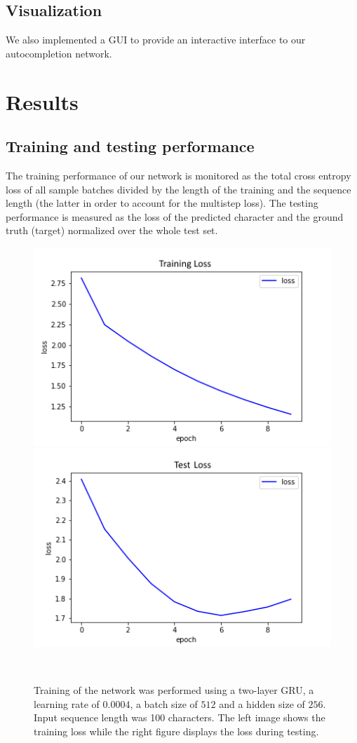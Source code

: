 \documentclass[11pt,a4paper,bibliography=totocnumbered,listof=totocnumbered]{scrartcl}
\begin{document}
\subsection{Visualization}
We also implemented a GUI to provide an interactive interface to our autocompletion network.  

\pagebreak

%
\section{Results} \label{sec:res}

\subsection{Training and testing performance}
The training performance of our network is monitored as the total cross entropy loss of all sample batches divided by the length of the training and the sequence length (the latter in order to account for the multistep loss). The testing performance is measured as the loss of the predicted character and the ground truth (target) normalized over the whole test set. 


\begin{figure}[H]
   \begin{minipage}{\textwidth}
     \centering
     \includegraphics[width=.4\textwidth]{loss_train_hs256_slow}
     \includegraphics[width=.4\textwidth]{loss_test_hs256_slow}
     \caption{Training of the network was performed using a two-layer GRU, a learning rate of $0.0004$, a batch size of $512$ and a hidden size of $256$. Input sequence length was 100 characters. The left image shows the training loss while the right figure displays the loss during testing.}
     \label{fig:loss1}
   \end{minipage}\\[1em]   
\end{figure}
\end{document}
